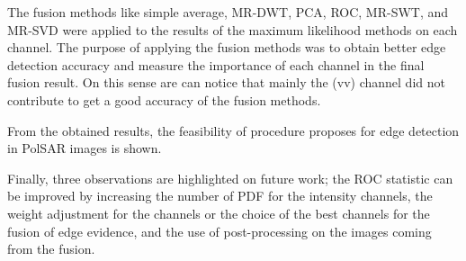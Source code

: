\documentclass[journal]{IEEEtran}
\begin{document}
The fusion methods like simple average, MR-DWT, PCA, ROC, MR-SWT, and MR-SVD were applied to the results of the maximum likelihood methods on each channel. The purpose of applying the fusion methods was to obtain better edge detection accuracy and measure the importance of each channel in the final fusion result. On this sense are can notice that mainly the (vv) channel did not contribute to get a good accuracy of the fusion methods.

From the obtained results, the feasibility of procedure proposes for edge detection in PolSAR images is shown.

Finally, three observations are highlighted on future work; the ROC statistic can be improved by increasing the number of PDF for the intensity channels, the weight adjustment for the channels or the choice of the best channels for the fusion of edge evidence, and the use of post-processing on the images coming from the fusion.



\end{document}
